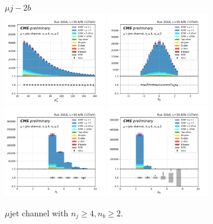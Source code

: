 \begin{figure}[ht]
    \centering
    $\mu j - 2b$ \\
    \includegraphics[width=0.4\textwidth]{chapters/Analysis/sectionPlots/figures/kinematics_pickles/mu4j/2b/mu4j_2b_lepton1_pt.pdf}
    \includegraphics[width=0.4\textwidth]{chapters/Analysis/sectionPlots/figures/kinematics_pickles/mu4j/2b/mu4j_2b_lepton1_eta.pdf}
    \includegraphics[width=0.4\textwidth]{chapters/Analysis/sectionPlots/figures/kinematics_pickles/mu4j/2b/mu4j_2b_nJets.pdf}
    \includegraphics[width=0.4\textwidth]{chapters/Analysis/sectionPlots/figures/kinematics_pickles/mu4j/2b/mu4j_2b_nBJets.pdf}
    
    \caption{$\mu$jet channel with $n_j\geq4, n_b\geq2$.}
\end{figure}













